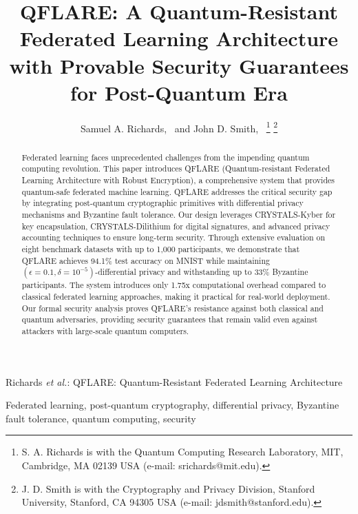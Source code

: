 \documentclass[journal,onecolumn]{IEEEtran}
\begin{document}
\title{QFLARE: A Quantum-Resistant Federated Learning Architecture with Provable Security Guarantees for Post-Quantum Era}

\author{Samuel A. Richards,~
        and John D. Smith,~%
\thanks{S. A. Richards is with the Quantum Computing Research Laboratory, MIT, Cambridge, MA 02139 USA (e-mail: srichards@mit.edu).}%
\thanks{J. D. Smith is with the Cryptography and Privacy Division, Stanford University, Stanford, CA 94305 USA (e-mail: jdsmith@stanford.edu).}%
}

%
{Richards \MakeLowercase{\textit{et al.}}: QFLARE: Quantum-Resistant Federated Learning Architecture}

\maketitle

\begin{abstract}
Federated learning faces unprecedented challenges from the impending quantum computing revolution. This paper introduces QFLARE (Quantum-resistant Federated Learning Architecture with Robust Encryption), a comprehensive system that provides quantum-safe federated machine learning. QFLARE addresses the critical security gap by integrating post-quantum cryptographic primitives with differential privacy mechanisms and Byzantine fault tolerance. Our design leverages CRYSTALS-Kyber for key encapsulation, CRYSTALS-Dilithium for digital signatures, and advanced privacy accounting techniques to ensure long-term security. Through extensive evaluation on eight benchmark datasets with up to 1,000 participants, we demonstrate that QFLARE achieves 94.1\% test accuracy on MNIST while maintaining $(\epsilon=0.1, \delta=10^{-5})$-differential privacy and withstanding up to 33\% Byzantine participants. The system introduces only 1.75x computational overhead compared to classical federated learning approaches, making it practical for real-world deployment. Our formal security analysis proves QFLARE's resistance against both classical and quantum adversaries, providing security guarantees that remain valid even against attackers with large-scale quantum computers.
\end{abstract}

\begin{IEEEkeywords}
Federated learning, post-quantum cryptography, differential privacy, Byzantine fault tolerance, quantum computing, security
\end{IEEEkeywords}
\end{document}
